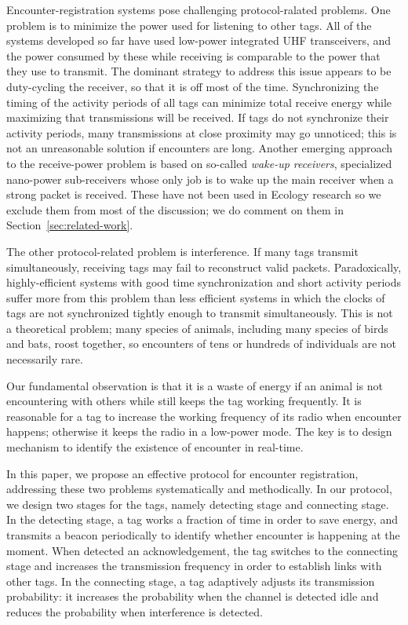 Encounter-registration systems pose challenging protocol-ralated problems. One problem is to minimize
the power used for listening to other tags. All of the systems developed so far have used low-power integrated
UHF transceivers, and the power consumed by these while receiving is comparable to the power that they use
to transmit. The dominant strategy to address this issue appears to be duty-cycling the receiver, so that it is
off most of the time. Synchronizing the timing of the activity periods of all tags can minimize total receive energy
while maximizing that transmissions will be received. If tags do not synchronize their activity periods, many transmissions
at close proximity may go unnoticed; this is not an unreasonable solution if encounters are long. Another emerging approach
to the receive-power problem is based on so-called {\em wake-up receivers}, specialized nano-power sub-receivers whose only
job is to wake up the main receiver when a strong packet is received. These have not been used in Ecology research so we
exclude them from most of the discussion; we do comment on them in Section~\ref{sec:related-work}.

The other protocol-related problem is interference. If many tags transmit simultaneously, receiving tags may fail
to reconstruct valid packets. Paradoxically, highly-efficient systems with good time synchronization and short activity
periods suffer more from this problem than less efficient systems in which the clocks of tags are not synchronized tightly
enough to transmit simultaneously. This is not a theoretical problem; many species of animals, including many species of
birds and bats, roost together, so encounters of tens or hundreds of individuals are not necessarily rare.

Our fundamental observation is that it is a waste of energy if an animal is not encountering with others
while still keeps the tag working frequently.
It is reasonable for a tag to
increase the working frequency of its radio when encounter happens; otherwise it keeps
the radio in a low-power mode. The key is to design mechanism
to identify the existence of encounter in real-time. 



In this paper, we propose an effective protocol for encounter registration, 
addressing these two problems systematically and
methodically. In our protocol, 
we design two stages for the tags, namely detecting stage and connecting stage.
In the detecting stage, a tag works a fraction of time in order to save energy,
and transmits a beacon periodically to identify whether encounter is happening at the moment.
When detected an acknowledgement, the tag switches to the connecting stage and increases the 
transmission frequency in order to establish links with other tags. In the connecting stage,
a tag adaptively adjusts its transmission probability: it increases the probability when 
the channel is detected idle and reduces the probability when interference is detected.  


